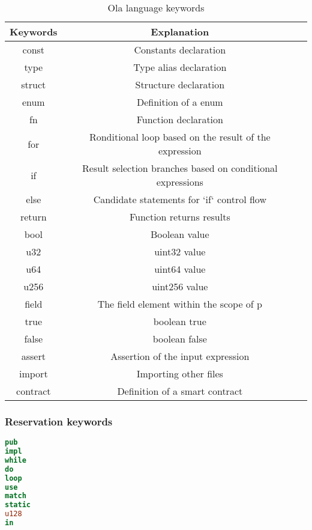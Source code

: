 \begin{table}[!ht]
\centering
\begin{tabular}{c|c|c}
\textbf{Keywords} & \textbf{Explanation} \\ \hline
const & Constants declaration \\
type & Type alias declaration \\
struct & Structure declaration \\
enum & Definition of a enum \\
fn & Function declaration \\
for & Ronditional loop based on the result of the expression \\
if & Result selection branches based on conditional expressions \\
else & Candidate statements for `if` control flow \\
return & Function returns results \\
bool & Boolean value \\
u32 & uint32 value \\
u64 & uint64 value \\
u256 & uint256 value \\
field & The field element within the scope of p \\
true & boolean true \\
false & boolean false \\
assert & Assertion of the input expression \\
import & Importing other files \\
contract & Definition of a smart contract \\
\end{tabular}
\caption{Ola language keywords}
\label{table: ola-lang-keywords}
\end{table}

\subsubsection*{Reservation keywords}

\begin{lstlisting}[language=Rust]
pub
impl
while
do
loop
use
match
static
u128
in
\end{lstlisting}
    